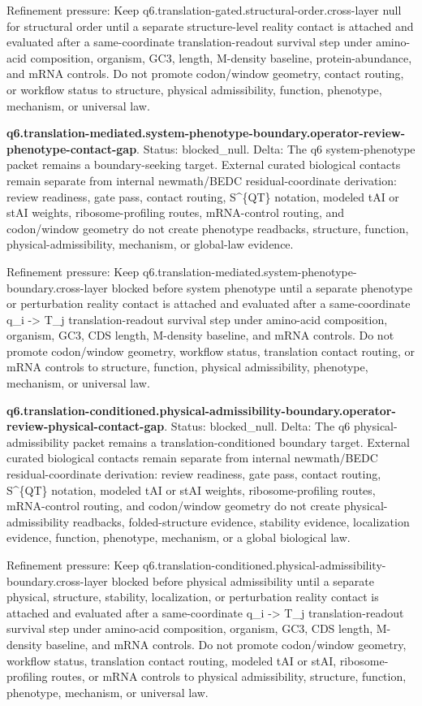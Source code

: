 Refinement pressure: Keep q6.translation-gated.structural-order.cross-layer null for structural order until a separate structure-level reality contact is attached and evaluated after a same-coordinate translation-readout survival step under amino-acid composition, organism, GC3, length, M-density baseline, protein-abundance, and mRNA controls. Do not promote codon/window geometry, contact routing, or workflow status to structure, physical admissibility, function, phenotype, mechanism, or universal law.

\textbf{q6.translation-mediated.system-phenotype-boundary.operator-review-phenotype-contact-gap}. Status: blocked\_null. Delta: The q6 system-phenotype packet remains a boundary-seeking target. External curated biological contacts remain separate from internal newmath/BEDC residual-coordinate derivation: review readiness, gate pass, contact routing, S\textasciicircum{}\{QT\} notation, modeled tAI or stAI weights, ribosome-profiling routes, mRNA-control routing, and codon/window geometry do not create phenotype readbacks, structure, function, physical-admissibility, mechanism, or global-law evidence.

Refinement pressure: Keep q6.translation-mediated.system-phenotype-boundary.cross-layer blocked before system phenotype until a separate phenotype or perturbation reality contact is attached and evaluated after a same-coordinate q\_i -> T\_j translation-readout survival step under amino-acid composition, organism, GC3, CDS length, M-density baseline, and mRNA controls. Do not promote codon/window geometry, workflow status, translation contact routing, or mRNA controls to structure, function, physical admissibility, phenotype, mechanism, or universal law.

\textbf{q6.translation-conditioned.physical-admissibility-boundary.operator-review-physical-contact-gap}. Status: blocked\_null. Delta: The q6 physical-admissibility packet remains a translation-conditioned boundary target. External curated biological contacts remain separate from internal newmath/BEDC residual-coordinate derivation: review readiness, gate pass, contact routing, S\textasciicircum{}\{QT\} notation, modeled tAI or stAI weights, ribosome-profiling routes, mRNA-control routing, and codon/window geometry do not create physical-admissibility readbacks, folded-structure evidence, stability evidence, localization evidence, function, phenotype, mechanism, or a global biological law.

Refinement pressure: Keep q6.translation-conditioned.physical-admissibility-boundary.cross-layer blocked before physical admissibility until a separate physical, structure, stability, localization, or perturbation reality contact is attached and evaluated after a same-coordinate q\_i -> T\_j translation-readout survival step under amino-acid composition, organism, GC3, CDS length, M-density baseline, and mRNA controls. Do not promote codon/window geometry, workflow status, translation contact routing, modeled tAI or stAI, ribosome-profiling routes, or mRNA controls to physical admissibility, structure, function, phenotype, mechanism, or universal law.

